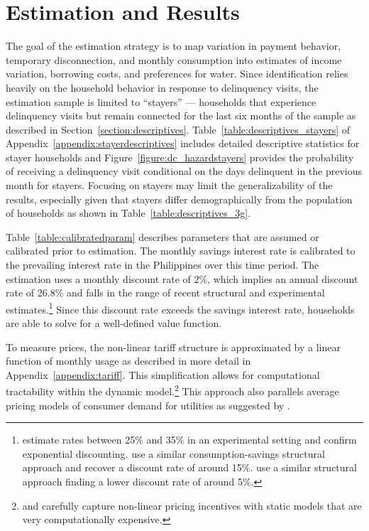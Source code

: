 \documentclass[12pt]{article}
\begin{document}
\section{Estimation and Results}\label{section:estimation}    %

The goal of the estimation strategy is to map variation in payment behavior, temporary disconnection, and monthly consumption into estimates of income variation, borrowing costs, and preferences for water.  Since identification relies heavily on the household behavior in response to delinquency visits, the estimation sample is limited to ``stayers'' --- households that experience delinquency visits but remain connected for the last six months of the sample as described in Section~\ref{section:descriptives}.  Table~\ref{table:descriptives_stayers} of Appendix~\ref{appendix:stayerdescriptives} includes detailed descriptive statistics for stayer households and Figure~\ref{figure:dc_hazardstayers} provides the probability of receiving a delinquency visit conditional on the days delinquent in the previous month for stayers.  Focusing on stayers may limit the generalizability of the results, especially given that stayers differ demographically from the population of households as shown in Table~\ref{table:descriptives_3g}.

Table~\ref{table:calibratedparam} describes parameters that are assumed or calibrated prior to estimation.  The monthly savings interest rate is calibrated to the prevailing interest rate in the Philippines over this time period.  The estimation uses a monthly discount rate of 2\%, which implies an annual discount rate of 26.8\% and falls in the range of recent structural and experimental estimates.\footnote{\cite{andreoni2012estimating} estimate rates between 25\% and 35\% in an experimental setting and confirm exponential discounting.  \cite{laibson2007estimating} use a similar consumption-savings structural approach and recover a discount rate of around 15\%.  \cite{gourinchas2002consumption} use a similar structural approach finding a lower discount rate of around 5\%.}  Since this discount rate exceeds the savings interest rate, households are able to solve for a well-defined value function.

To measure prices, the non-linear tariff structure is approximated by a linear function of monthly usage as described in more detail in Appendix~\ref{appendix:tariff}.  This simplification allows for computational tractability within the dynamic model.\footnote{\cite{wjv} and \cite{szabo2015value} carefully capture non-linear pricing incentives with static models that are very computationally expensive.}  This approach also parallels average pricing models of consumer demand for utilities as suggested by \cite{ito2014consumers}.  
\end{document}
